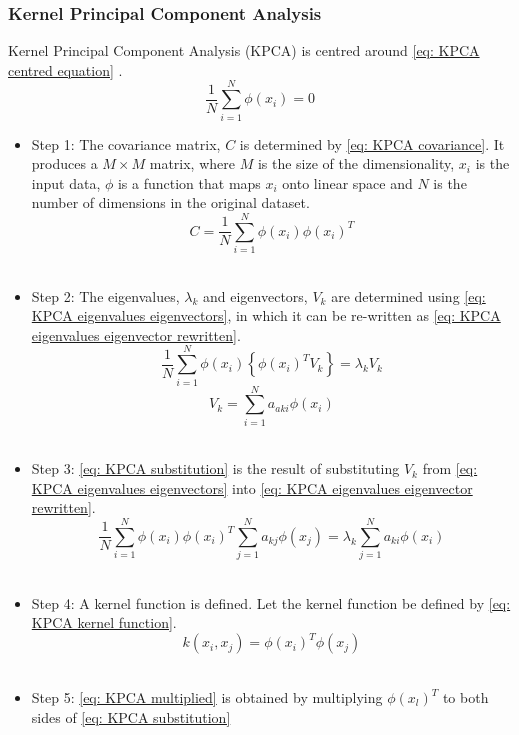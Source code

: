 \documentclass[11pt]{article}
\begin{document}
	\subsubsection{Kernel Principal Component Analysis}
	Kernel Principal Component Analysis (KPCA) is centred around \eqref{eq: KPCA centred equation} \cite{Ibrahim_Baharudin2016}.
	\begin{equation}
		\label{eq: KPCA centred equation}
		\frac{1}{N}\sum_{i=1}^{N}\phi(x_i)=0
	\end{equation}
	\begin{itemize}
		\item Step 1: The covariance matrix, $C$ is determined by \eqref{eq: KPCA covariance}. It produces a $M \times M$ matrix, where $M$ is the size of the dimensionality, $x_i$ is the input data, $\phi$ is a function that maps $x_i$ onto linear space and $N$ is the number of dimensions in the original dataset.
		\begin{equation}
			\label{eq: KPCA covariance}
			C = \frac{1}{N}\sum_{i=1}^{N}\phi(x_i)\phi(x_i)^T
		\end{equation} \\
		\item Step 2: The eigenvalues, $\lambda_k$ and eigenvectors, $V_k$ are determined using \eqref{eq: KPCA eigenvalues eigenvectors}, in which it can be re-written as \eqref{eq: KPCA eigenvalues eigenvector rewritten}.
		\begin{equation}
			\label{eq: KPCA eigenvalues eigenvectors}
			\frac{1}{N}\sum_{i=1}^{N}\phi(x_i)\left\{\phi(x_i)^TV_k\right\} = \lambda_k V_k
		\end{equation} 
		\begin{equation}
			\label{eq: KPCA eigenvalues eigenvector rewritten}
			V_k = \sum_{i=1}^{N}a_{aki}\phi(x_i)
		\end{equation} \\
		\item Step 3: \eqref{eq: KPCA substitution} is the result of substituting $V_k$ from \eqref{eq: KPCA eigenvalues eigenvectors} into \eqref{eq: KPCA eigenvalues eigenvector rewritten}.
		\begin{equation}
			\label{eq: KPCA substitution}
			\frac{1}{N}\sum_{i=1}^{N}\phi(x_i)\phi(x_i)^T \sum_{j=1}^{N}a_{kj}\phi(x_j) = \lambda_{k}\sum_{j=1}^{N}a_{ki}\phi(x_i)
		\end{equation} \\
		\item Step 4: A kernel function is defined. Let the kernel function be defined by \eqref{eq: KPCA kernel function}.
		\begin{equation}
			\label{eq: KPCA kernel function}
			k(x_i, x_j) = \phi(x_i)^T\phi(x_j)
		\end{equation}\\
		\item Step 5: \eqref{eq: KPCA multiplied} is obtained by multiplying $\phi(x_l)^T$ to both sides of \eqref{eq: KPCA substitution}
	\end{itemize}
\end{document}
